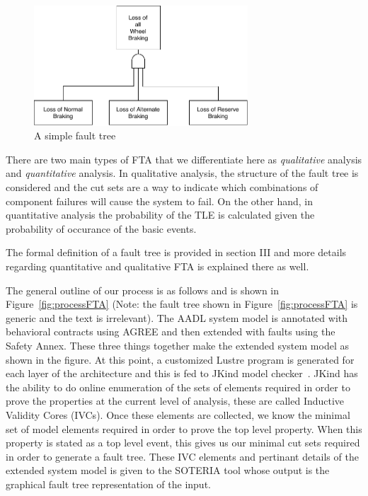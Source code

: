 \begin{figure}[h]
\begin{center}
\includegraphics[width=8cm]{images/introFT2.pdf}
\caption{A simple fault tree} \label{fig:introFT}
\end{center}
\end{figure}

There are two main types of FTA that we differentiate here as \textit{qualitative} analysis and \textit{quantitative} analysis. In qualitative analysis, the structure of the fault tree is considered and the cut sets are a way to indicate which combinations of component failures will cause the system to fail. On the other hand, in quantitative analysis the probability of the TLE is calculated given the probability of occurance of the basic events. 

The formal definition of a fault tree is provided in section III and more details regarding quantitative and qualitative FTA is explained there as well. 

The general outline of our process is as follows and is shown in Figure~\ref{fig:processFTA} (Note: the fault tree shown in Figure~\ref{fig:processFTA} is generic and the text is irrelevant). The AADL system model is annotated with behavioral contracts using AGREE and then extended with faults using the Safety Annex. These three things together make the extended system model as shown in the figure. At this point, a customized Lustre program is generated for each layer of the architecture and this is fed to JKind model checker~\cite{2017arXiv171201222G}. JKind has the ability to do online enumeration of the sets of elements required in order to prove the properties at the current level of analysis, these are called Inductive Validity Cores (IVCs). Once these elements are collected, we know the minimal set of model elements required in order to prove the top level property. When this property is stated as a top level event, this gives us our minimal cut sets required in order to generate a fault tree. These IVC elements and pertinant details of the extended system model is given to the SOTERIA tool whose output is the graphical fault tree representation of the input. 

